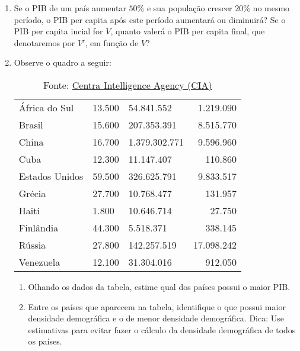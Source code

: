 \begin{enumerate}
\item Se o PIB de um país aumentar $50\%$ e sua população crescer $20\%$ no mesmo período, o PIB per capita após este período aumentará ou diminuirá? Se o PIB per capita incial for $V$,  quanto valerá o PIB per capita final, que denotaremos por $V'$, em função de $V$?

\item Observe o quadro a seguir:

\begin{table}[H]
\centering

\begin{tabular}{|l|e{.25\linewidth}|e{.25\linewidth}|r|}
\hline
{} &  &  &  \\
\hline
África do Sul & 13.500 & 54.841.552 & 1.219.090 \\
\hline
Brasil & 15.600 & 207.353.391 & 8.515.770 \\ 
\hline
China & 16.700 & 1.379.302.771 & 9.596.960 \\
\hline
Cuba & 12.300 & 11.147.407 & 110.860 \\ 
\hline
Estados Unidos & 59.500 & 326.625.791 & 9.833.517 \\
\hline
Grécia & 27.700 & 10.768.477 & 131.957 \\ 
\hline
Haiti & 1.800 & 10.646.714 & 27.750 \\
\hline
Finlândia & 44.300 & 5.518.371 & 338.145 \\
\hline
Rússia & 27.800 & 142.257.519 & 17.098.242 \\
\hline
Venezuela & 12.100 & 31.304.016 & 912.050 \\
\hline
\end{tabular}

\caption{Fonte: \href{https://www.cia.gov/library/publications/the-world-factbook/rankorder/2004rank.html}{Centra Intelligence Agency (CIA)}}
\end{table}

\begin{enumerate}
\item {} 
Olhando os dados da tabela, estime qual dos países possui o maior PIB.

\item {} 
Entre os países que aparecem na  tabela, identifique o que possui maior densidade demográfica    e o de  menor densidade demográfica. Dica: Use estimativas para evitar fazer o cálculo da densidade demográfica de todos os países.


\end{enumerate}
\end{enumerate}
